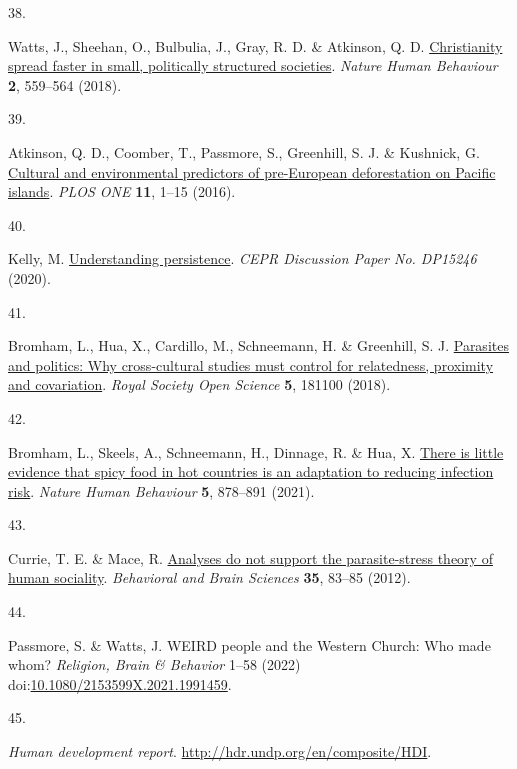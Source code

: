 \documentclass[
  man,floatsintext]{apa6}
\newlength{\cslhangindent}
\newlength{\csllabelwidth}
\newlength{\cslentryspacingunit} %
\newenvironment{CSLReferences}[2] %
 {%
  \setlength{\parindent}{0pt}
  \ifodd #1
  \let\oldpar\par
  \def\par{\hangindent=\cslhangindent\oldpar}
  \fi
  \setlength{\parskip}{#2\cslentryspacingunit}
 }%
 {}
\newcommand{\CSLLeftMargin}[1]{\parbox[t]{\csllabelwidth}{#1}}
\newcommand{\CSLRightInline}[1]{\parbox[t]{\linewidth - \csllabelwidth}{#1}\break}
\begin{document}
\begin{CSLReferences}{0}{0}
\leavevmode{}%
\CSLLeftMargin{38. }%
\CSLRightInline{Watts, J., Sheehan, O., Bulbulia, J., Gray, R. D. \& Atkinson, Q. D. \href{https://doi.org/10.1038/s41562-018-0379-3}{Christianity spread faster in small, politically structured societies}. \emph{Nature Human Behaviour} \textbf{2}, 559--564 (2018).}

\leavevmode{}%
\CSLLeftMargin{39. }%
\CSLRightInline{Atkinson, Q. D., Coomber, T., Passmore, S., Greenhill, S. J. \& Kushnick, G. \href{https://doi.org/10.1371/journal.pone.0156340}{Cultural and environmental predictors of pre-{European} deforestation on {Pacific} islands}. \emph{PLOS ONE} \textbf{11}, 1--15 (2016).}

\leavevmode{}%
\CSLLeftMargin{40. }%
\CSLRightInline{Kelly, M. \href{http://ssrn.com/abstract=3688200}{Understanding persistence}. \emph{CEPR Discussion Paper No. DP15246} (2020).}

\leavevmode{}%
\CSLLeftMargin{41. }%
\CSLRightInline{Bromham, L., Hua, X., Cardillo, M., Schneemann, H. \& Greenhill, S. J. \href{https://doi.org/10.1098/rsos.181100}{Parasites and politics: Why cross-cultural studies must control for relatedness, proximity and covariation}. \emph{Royal Society Open Science} \textbf{5}, 181100 (2018).}

\leavevmode{}%
\CSLLeftMargin{42. }%
\CSLRightInline{Bromham, L., Skeels, A., Schneemann, H., Dinnage, R. \& Hua, X. \href{https://doi.org/10.1038/s41562-020-01039-8}{There is little evidence that spicy food in hot countries is an adaptation to reducing infection risk}. \emph{Nature Human Behaviour} \textbf{5}, 878--891 (2021).}

\leavevmode{}%
\CSLLeftMargin{43. }%
\CSLRightInline{Currie, T. E. \& Mace, R. \href{https://doi.org/10.1017/S0140525X11000963}{Analyses do not support the parasite-stress theory of human sociality}. \emph{Behavioral and Brain Sciences} \textbf{35}, 83--85 (2012).}

\leavevmode{}%
\CSLLeftMargin{44. }%
\CSLRightInline{Passmore, S. \& Watts, J. {WEIRD} people and the {W}estern {C}hurch: Who made whom? \emph{Religion, Brain \& Behavior} 1--58 (2022) doi:\href{https://doi.org/10.1080/2153599X.2021.1991459}{10.1080/2153599X.2021.1991459}.}

\leavevmode{}%
\CSLLeftMargin{45. }%
\CSLRightInline{\emph{Human development report}. \url{http://hdr.undp.org/en/composite/HDI}.}


\end{CSLReferences}
\end{document}

